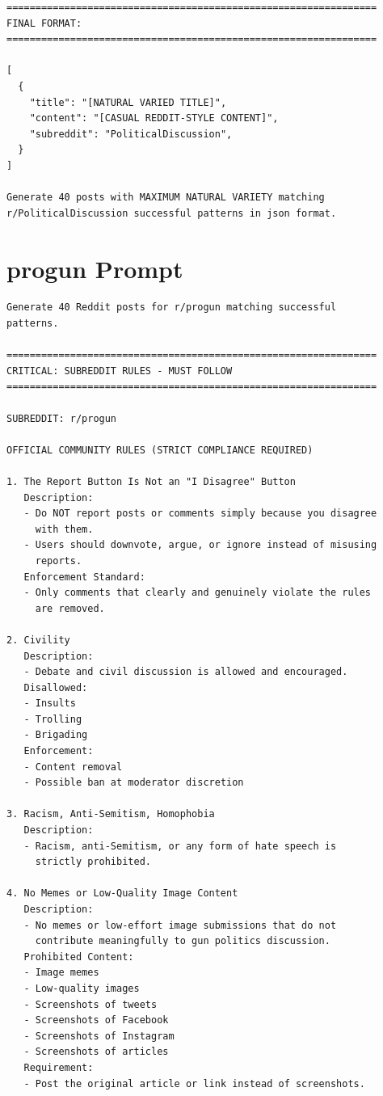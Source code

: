 \begin{small}
\begin{verbatim}
================================================================
FINAL FORMAT:
================================================================

[
  {
    "title": "[NATURAL VARIED TITLE]",
    "content": "[CASUAL REDDIT-STYLE CONTENT]",
    "subreddit": "PoliticalDiscussion",
  }
]

Generate 40 posts with MAXIMUM NATURAL VARIETY matching 
r/PoliticalDiscussion successful patterns in json format.
\end{verbatim}
\end{small}

\section{progun Prompt}

\begin{small}
\begin{verbatim}
Generate 40 Reddit posts for r/progun matching successful 
patterns.

================================================================
CRITICAL: SUBREDDIT RULES - MUST FOLLOW
================================================================

SUBREDDIT: r/progun

OFFICIAL COMMUNITY RULES (STRICT COMPLIANCE REQUIRED)

1. The Report Button Is Not an "I Disagree" Button
   Description:
   - Do NOT report posts or comments simply because you disagree 
     with them.
   - Users should downvote, argue, or ignore instead of misusing 
     reports.
   Enforcement Standard:
   - Only comments that clearly and genuinely violate the rules 
     are removed.

2. Civility
   Description:
   - Debate and civil discussion is allowed and encouraged.
   Disallowed:
   - Insults
   - Trolling
   - Brigading
   Enforcement:
   - Content removal
   - Possible ban at moderator discretion

3. Racism, Anti-Semitism, Homophobia
   Description:
   - Racism, anti-Semitism, or any form of hate speech is 
     strictly prohibited.

4. No Memes or Low-Quality Image Content
   Description:
   - No memes or low-effort image submissions that do not 
     contribute meaningfully to gun politics discussion.
   Prohibited Content:
   - Image memes
   - Low-quality images
   - Screenshots of tweets
   - Screenshots of Facebook
   - Screenshots of Instagram
   - Screenshots of articles
   Requirement:
   - Post the original article or link instead of screenshots.


\end{verbatim}
\end{small}
